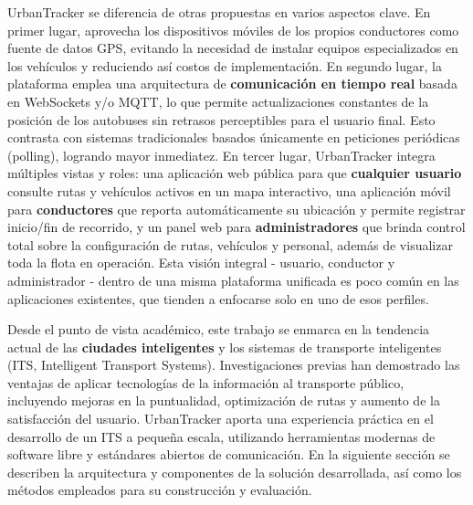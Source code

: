 UrbanTracker se diferencia de otras propuestas en varios aspectos clave. En primer lugar, aprovecha los dispositivos móviles de los propios conductores como fuente de datos GPS, evitando la necesidad de instalar equipos especializados en los vehículos y reduciendo así costos de implementación. En segundo lugar, la plataforma emplea una arquitectura de \textbf{comunicación en tiempo real} basada en WebSockets y/o MQTT, lo que permite actualizaciones constantes de la posición de los autobuses sin retrasos perceptibles para el usuario final. Esto contrasta con sistemas tradicionales basados únicamente en peticiones periódicas (polling), logrando mayor inmediatez. En tercer lugar, UrbanTracker integra múltiples vistas y roles: una aplicación web pública para que \textbf{cualquier usuario} consulte rutas y vehículos activos en un mapa interactivo, una aplicación móvil para \textbf{conductores} que reporta automáticamente su ubicación y permite registrar inicio/fin de recorrido, y un panel web para \textbf{administradores} que brinda control total sobre la configuración de rutas, vehículos y personal, además de visualizar toda la flota en operación. Esta visión integral - usuario, conductor y administrador - dentro de una misma plataforma unificada es poco común en las aplicaciones existentes, que tienden a enfocarse solo en uno de esos perfiles.

Desde el punto de vista académico, este trabajo se enmarca en la tendencia actual de las \textbf{ciudades inteligentes} y los sistemas de transporte inteligentes (ITS, Intelligent Transport Systems). Investigaciones previas han demostrado las ventajas de aplicar tecnologías de la información al transporte público, incluyendo mejoras en la puntualidad, optimización de rutas y aumento de la satisfacción del usuario. UrbanTracker aporta una experiencia práctica en el desarrollo de un ITS a pequeña escala, utilizando herramientas modernas de software libre y estándares abiertos de comunicación. En la siguiente sección se describen la arquitectura y componentes de la solución desarrollada, así como los métodos empleados para su construcción y evaluación.
